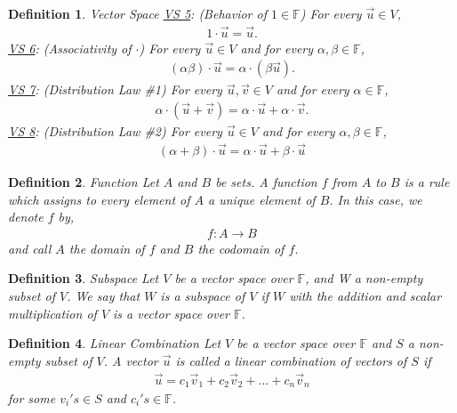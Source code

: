 \documentclass[12pt,answers]{exam}
\newtheorem{definition}{Definition}[section]
\begin{document}
\begin{definition}{Vector Space}
\newline\newline\noindent
\underline{VS 5}: (Behavior of $1\in \mathbb{F}$) For every $\vec{u}\in V$,
\begin{align*}
	1\cdot \vec{u}=\vec{u}.
\end{align*}
\noindent
\underline{VS 6}: (Associativity of $\cdot$) For every $\vec{u}\in V$ and for every $\alpha, \beta \in \mathbb{F}$,
\begin{align*}
	(\alpha\beta)\cdot\vec{u}=\alpha\cdot(\beta\vec{u}).
\end{align*}
\underline{VS 7}: (Distribution Law \#1) For every $\vec{u},\vec{v}\in V$ and for every $\alpha\in \mathbb{F}$,
\begin{align*}
	\alpha\cdot(\vec{u}+\vec{v})=\alpha\cdot\vec{u}+\alpha\cdot\vec{v}.
\end{align*}
\underline{VS 8}: (Distribution Law \#2) For every $\vec{u}\in V$ and for every $\alpha, \beta \in \mathbb{F}$,
\begin{align*}
	(\alpha+\beta)\cdot\vec{u}=\alpha\cdot\vec{u}+\beta\cdot\vec{u}
\end{align*}
\end{definition}

\begin{definition}{Function}
Let $A$ and $B$ be sets. A function $f$ from $A$ to $B$ is a rule which assigns to every element of $A$ a unique element of $B$. In this case, we denote $f$ by,
\begin{align*}
	f:A\rightarrow B
\end{align*}
and call $A$ the domain of $f$ and $B$ the codomain of $f$.
\end{definition}

\begin{definition}{Subspace}
Let $V$ be a vector space over $\mathbb{F}$, and W a non-empty subset of $V$. We say that $W$ is a subspace of $V$ if $W$ with the addition and scalar multiplication of $V$ is a vector space over $\mathbb{F}$.
\end{definition}

\begin{definition}{Linear Combination} 
Let $V$ be a vector space over $\mathbb{F}$ and $S$ a non-empty subset of $V$. A vector $\vec{u}$ is called a linear combination of vectors of $S$ if
\begin{align*}
	\vec{u}=c_{1}\vec{v}_{1}+c_{2}\vec{v}_{2}+...+c_{n}\vec{v}_{n}
\end{align*}
for some $v_{i}'s\in S$ and $c_{i}'s\in \mathbb{F}$. 
\end{definition}
\end{document}
